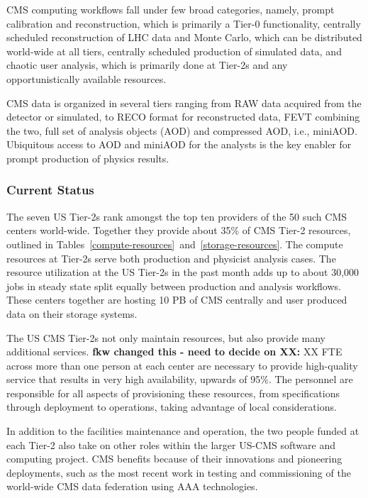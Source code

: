 \documentclass[11pt,a4paper]{article}
\begin{document}
CMS computing workflows fall under few broad categories, namely, prompt
calibration and reconstruction, which is primarily a Tier-0 functionality, 
centrally scheduled reconstruction of LHC data and Monte Carlo, which 
can be distributed world-wide at all tiers, centrally scheduled production 
of simulated data, and chaotic user analysis, which is primarily done at 
Tier-2s and any opportunistically available resources.

CMS data is organized in several tiers ranging from RAW data acquired
from the detector or simulated, to RECO format for reconstructed data, 
FEVT combining the two, full set of analysis objects (AOD) and 
compressed AOD, i.e., miniAOD. Ubiquitous access to AOD and miniAOD 
for the analysts is the key enabler for prompt production of physics
results.

\subsubsection{Current Status}

The seven US Tier-2s rank amongst the top ten providers of the 50 such 
CMS centers world-wide. Together they provide about 35\% of CMS
Tier-2 resources, outlined in Tables~\ref{compute-resources}~and~\ref{storage-resources}.  
The compute resources at Tier-2s serve both production and physicist analysis cases.  
The resource utilization at the US Tier-2s in the past month adds up to about 30,000 jobs 
in steady state split equally between production and analysis workflows. 
These centers together are hosting 10 PB of CMS centrally and
user produced data on their storage systems.


The US CMS Tier-2s not only maintain resources, but also provide many additional services. 
 {\bf fkw changed this - need to decide on XX:} XX FTE across more than one person at each center
are necessary to provide high-quality service that results in 
very high availability, upwards of 95\%. The personnel are responsible
for all aspects of provisioning these resources, from specifications through
deployment to operations, taking advantage of local considerations. 

In addition to the facilities maintenance and operation, the two people funded at each Tier-2 also take 
on other roles within the larger US-CMS software and computing project.  CMS benefits
because of their innovations and pioneering deployments, such as
the most recent work in testing and commissioning of the world-wide
CMS data federation using AAA technologies.
\end{document}

